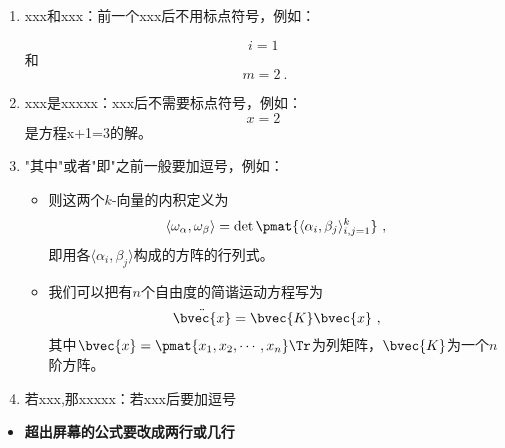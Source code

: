 \begin{enumerate}
\item xxx和xxx：前一个xxx后不用标点符号，例如：

\begin{equation}
i=1~
\end{equation}
和
\begin{equation}
m=2~.
\end{equation}
 \item xxx是xxxxx：xxx后不需要标点符号，例如：
\begin{equation}
x=2~
\end{equation}
是方程x+1=3的解。
\item "其中"或者"即"之前一般要加逗号，例如：
\begin{itemize}
\item 则这两个$k$-向量的内积定义为
\begin{equation}
\langle\omega_\alpha, \omega_\beta\rangle = \det \pmat{\langle \alpha_i, \beta_j \rangle_{i, j=1}^k}~,
\end{equation}
即用各$\langle \alpha_i, \beta_j \rangle$构成的方阵的行列式。
\end{itemize}
\begin{itemize}
\item 
我们可以把有$n$个自由度的简谐运动方程写为
\begin{equation}
\ddot{\bvec{x}} = \bvec{K}\bvec{x}~,
\end{equation}
其中$\bvec{x}=\pmat{x_1, x_2, \cdots, x_n}\Tr$为列矩阵，$\bvec{K}$为一个$n$阶方阵。

\end{itemize}
\item 若xxx,那xxxxx：若xxx后要加逗号

\end{enumerate}
\begin{itemize}
\item \textbf{超出屏幕的公式要改成两行或几行}
\end{itemize}




